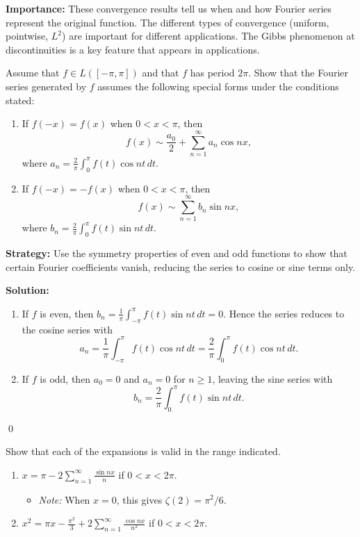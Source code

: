 \noindent\textbf{Importance:} These convergence results tell us when and how Fourier series represent the original function. The different types of convergence (uniform, pointwise, $L^2$) are important for different applications. The Gibbs phenomenon at discontinuities is a key feature that appears in applications.





\begin{problembox}
\begin{problemstatement}
Assume that $f \in L([-\pi, \pi])$ and that $f$ has period $2\pi$. Show that the Fourier series generated by $f$ assumes the following special forms under the conditions stated:
\begin{enumerate}[label=(\alph*)]
\item If $f(-x) = f(x)$ when $0 < x < \pi$, then
\[
f(x) \sim \frac{a_0}{2} + \sum_{n=1}^\infty a_n \cos nx,
\]
where $a_n = \frac{2}{\pi} \int_0^\pi f(t) \cos nt \, dt$.
\item If $f(-x) = -f(x)$ when $0 < x < \pi$, then
\[
f(x) \sim \sum_{n=1}^\infty b_n \sin nx,
\]
where $b_n = \frac{2}{\pi} \int_0^\pi f(t) \sin nt \, dt$.
\end{enumerate}
\end{problemstatement}
\end{problembox}

\noindent\textbf{Strategy:} Use the symmetry properties of even and odd functions to show that certain Fourier coefficients vanish, reducing the series to cosine or sine terms only.

\bigskip\noindent\textbf{Solution:}
\begin{enumerate}[label=(\alph*)]
\item If $f$ is even, then $b_n=\tfrac{1}{\pi}\int_{-\pi}^{\pi} f(t)\sin nt\,dt=0$. Hence the series reduces to the cosine series with
\[a_n=\frac{1}{\pi}\int_{-\pi}^{\pi} f(t)\cos nt\,dt=\frac{2}{\pi}\int_0^{\pi} f(t)\cos nt\,dt.\]
\item If $f$ is odd, then $a_0=0$ and $a_n=0$ for $n\ge1$, leaving the sine series with
\[b_n=\frac{2}{\pi}\int_0^{\pi} f(t)\sin nt\,dt.\]
\end{enumerate}\qed


\begin{problembox}
\begin{problemstatement}
Show that each of the expansions is valid in the range indicated.
\begin{enumerate}[label=(\alph*)]
\item $x = \pi - 2 \sum_{n=1}^\infty \frac{\sin nx}{n}$ if $0 < x < 2\pi$.
\begin{itemize}
\item \textit{Note:} When $x = 0$, this gives $\zeta(2) = \pi^2/6$.
\end{itemize}
\item $x^2 = \pi x - \frac{\pi^2}{3} + 2 \sum_{n=1}^\infty \frac{\cos nx}{n^2}$ if $0 < x < 2\pi$.
\end{enumerate}
\end{problemstatement}
\end{problembox}

